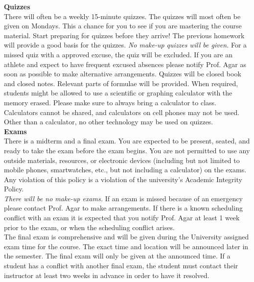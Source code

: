 \documentclass[11pt,letterpaper]{article}
\newcommand{\lefthead}[2]{\noindent\textbf{#1}\hfill\\[#2]}
\begin{document}
\lefthead{Quizzes}{0.3cm}
\noindent There will often be a weekly 15-minute quizzes. 
The quizzes will most often be given on Mondays. 
This a chance for you to see if you are mastering the course material. 
Start preparing for quizzes before they arrive! 
The previous homework will provide a good basis for the quizzes. 
\emph{No make-up quizzes will be given.} 
For a missed quiz with a approved excuse, the quiz will be excluded.
If you are an athlete and expect to have frequent excused absences please notify Prof. Agar as soon as possible to make alternative arrangements.
Quizzes will be closed book and closed notes. 
Relevant parts of formulae will be provided.
When required, students might be allowed to use a scientific or graphing calculator with the memory erased.
Please make sure to always bring a calculator to class.
Calculators cannot be shared, and calculators on cell phones may not be used. 
Other than a calculator, no other technology may be used on quizzes. \\[0.3cm]

\lefthead{Exams}{0.3cm}
\noindent There is a midterm and a final exam. You are expected to be present, seated, and ready to take the exam before the exam begins. You are not permitted to use any outside materials, resources, or electronic devices (including but not limited to mobile phones, smartwatches, etc., but not including a calculator) on the exams. Any violation of this policy is a violation of the university's Academic Integrity Policy. \\

\noindent \emph{There will be no make-up exams.} If an exam is missed because of an emergency please contact Prof. Agar to make arrangements. If there is a known scheduling conflict with an exam it is expected that you notify Prof. Agar at least 1 week prior to the exam, or when the scheduling conflict arises. \\

\noindent The final exam is comprehensive and will be given during the University assigned exam time for the course. The exact time and location will be announced later in the semester. The final exam will only be given at the announced time. If a student has a conflict with another final exam, the student must contact their instructor at least two weeks in advance in order to have it resolved. 
\\[0.3cm]
\end{document}
